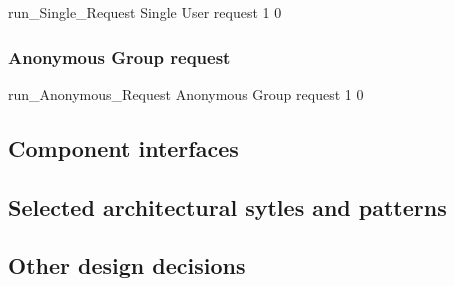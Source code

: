 \documentclass[../DD0.tex]{subfiles}
\begin{document}
\label{sec:singleuser}

    \fetchUML
      {run_Single_Request}
      {Single User request}
      {1}           %
      {0}           %

  \clearpage

\subsubsection{Anonymous Group request}

\label{sec:anonymousgroup}

    \fetchUML
      {run_Anonymous_Request}
      {Anonymous Group request}
      {1}           %
      {0}           %

  \clearpage

  \subsection{Component interfaces}
  \label{sec:compinterf}

  \subsection{Selected architectural sytles and patterns}
  \label{sec:stylesandpatterns}

  \subsection{Other design decisions}
  \label{sec:designdecisions}
\end{document}
